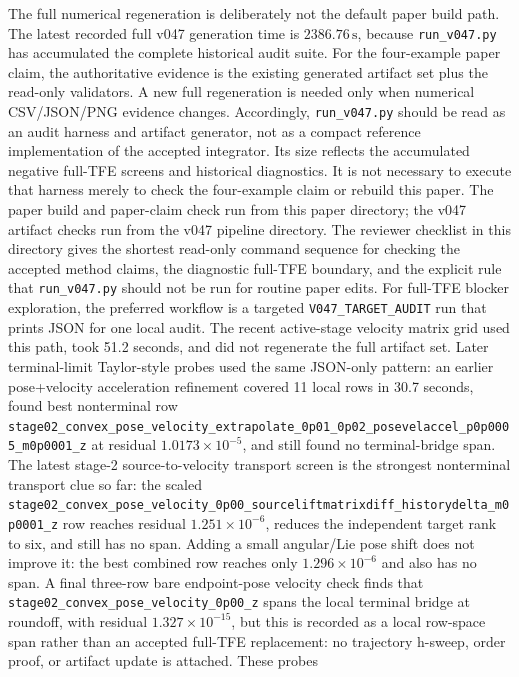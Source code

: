 \documentclass[11pt]{article}
\newcommand{\tfe}{TFE}
\newcommand{\artifact}[1]{\texttt{#1}}
\begin{document}
The full numerical regeneration is deliberately not the default paper build
path.  The latest recorded full v047 generation time is
$2386.76\,\mathrm{s}$, because \artifact{run\_v047.py} has accumulated the
complete historical audit suite.  For the four-example paper claim, the
authoritative evidence is the existing generated artifact set plus the
read-only validators.  A new full regeneration is needed only when numerical
CSV/JSON/PNG evidence changes.
Accordingly, \artifact{run\_v047.py} should be read as an audit harness and
artifact generator, not as a compact reference implementation of the accepted
integrator.  Its size reflects the accumulated negative full-\tfe{} screens and
historical diagnostics.  It is not necessary to execute that harness merely to
check the four-example claim or rebuild this paper.
The paper build and paper-claim check run from this paper directory; the v047
artifact checks run from the v047 pipeline directory.
The reviewer checklist in this directory gives the shortest read-only command
sequence for checking the accepted method claims, the diagnostic full-\tfe{}
boundary, and the explicit rule that \artifact{run\_v047.py} should not be run
for routine paper edits.
For full-\tfe{} blocker exploration, the preferred workflow is a targeted
\artifact{V047\_TARGET\_AUDIT} run that prints JSON for one local audit.  The
recent active-stage velocity matrix grid used this path, took 51.2 seconds,
and did not regenerate the full artifact set.  Later terminal-limit
Taylor-style probes used the same JSON-only pattern: an earlier pose+velocity
acceleration refinement covered 11 local rows in 30.7 seconds, found best
nonterminal row
\nolinkurl{stage02_convex_pose_velocity_extrapolate_0p01_0p02_posevelaccel_p0p0005_m0p0001_z}
at residual $1.0173\times10^{-5}$, and still found no terminal-bridge span.
The latest stage-2 source-to-velocity transport screen is the strongest
nonterminal transport clue so far: the scaled
\nolinkurl{stage02_convex_pose_velocity_0p00_sourceliftmatrixdiff_historydelta_m0p0001_z}
row reaches residual $1.251\times10^{-6}$, reduces the independent target rank
to six, and still has no span.  Adding a small angular/Lie pose shift does not
improve it: the best combined row reaches only $1.296\times10^{-6}$ and also
has no span.  A final three-row bare endpoint-pose velocity check finds that
\nolinkurl{stage02_convex_pose_velocity_0p00_z} spans the local terminal
bridge at roundoff, with residual $1.327\times10^{-15}$, but this is recorded
as a local row-space span rather than an accepted full-\tfe{} replacement: no
trajectory h-sweep, order proof, or artifact update is attached.  These probes
\end{document}
